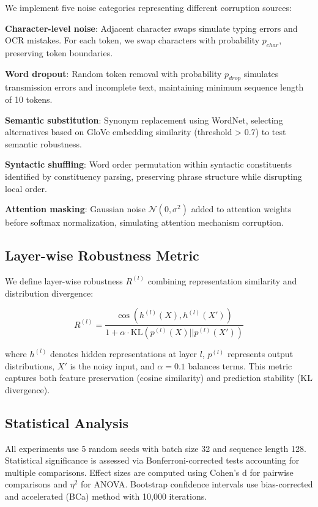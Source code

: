 \documentclass{article}
\begin{document}
We implement five noise categories representing different corruption sources:

\textbf{Character-level noise}: Adjacent character swaps simulate typing errors and OCR mistakes. For each token, we swap characters with probability $p_{char}$, preserving token boundaries.

\textbf{Word dropout}: Random token removal with probability $p_{drop}$ simulates transmission errors and incomplete text, maintaining minimum sequence length of 10 tokens.

\textbf{Semantic substitution}: Synonym replacement using WordNet, selecting alternatives based on GloVe embedding similarity (threshold > 0.7) to test semantic robustness.

\textbf{Syntactic shuffling}: Word order permutation within syntactic constituents identified by constituency parsing, preserving phrase structure while disrupting local order.

\textbf{Attention masking}: Gaussian noise $\mathcal{N}(0, \sigma^2)$ added to attention weights before softmax normalization, simulating attention mechanism corruption.

\subsection{Layer-wise Robustness Metric}

We define layer-wise robustness $R^{(l)}$ combining representation similarity and distribution divergence:

\begin{equation}
R^{(l)} = \frac{\cos(h^{(l)}(X), h^{(l)}(X'))}{1 + \alpha \cdot \text{KL}(p^{(l)}(X)||p^{(l)}(X'))}
\label{eq:robustness}
\end{equation}

where $h^{(l)}$ denotes hidden representations at layer $l$, $p^{(l)}$ represents output distributions, $X'$ is the noisy input, and $\alpha=0.1$ balances terms. This metric captures both feature preservation (cosine similarity) and prediction stability (KL divergence).

\subsection{Statistical Analysis}

All experiments use 5 random seeds with batch size 32 and sequence length 128. Statistical significance is assessed via Bonferroni-corrected tests accounting for multiple comparisons. Effect sizes are computed using Cohen's d for pairwise comparisons and $\eta^2$ for ANOVA. Bootstrap confidence intervals use bias-corrected and accelerated (BCa) method with 10,000 iterations.
\end{document}

